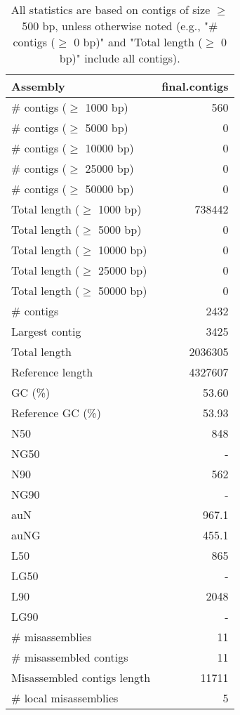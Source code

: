\documentclass[12pt,a4paper]{article}
\begin{document}
\begin{table}[ht]
\begin{center}
\caption{All statistics are based on contigs of size $\geq$ 500 bp, unless otherwise noted (e.g., "\# contigs ($\geq$ 0 bp)" and "Total length ($\geq$ 0 bp)" include all contigs).}
\begin{tabular}{|l*{1}{|r}|}
\hline
Assembly & final.contigs \\ \hline
\# contigs ($\geq$ 1000 bp) & 560 \\ \hline
\# contigs ($\geq$ 5000 bp) & 0 \\ \hline
\# contigs ($\geq$ 10000 bp) & 0 \\ \hline
\# contigs ($\geq$ 25000 bp) & 0 \\ \hline
\# contigs ($\geq$ 50000 bp) & 0 \\ \hline
Total length ($\geq$ 1000 bp) & 738442 \\ \hline
Total length ($\geq$ 5000 bp) & 0 \\ \hline
Total length ($\geq$ 10000 bp) & 0 \\ \hline
Total length ($\geq$ 25000 bp) & 0 \\ \hline
Total length ($\geq$ 50000 bp) & 0 \\ \hline
\# contigs & 2432 \\ \hline
Largest contig & 3425 \\ \hline
Total length & 2036305 \\ \hline
Reference length & 4327607 \\ \hline
GC (\%) & 53.60 \\ \hline
Reference GC (\%) & 53.93 \\ \hline
N50 & 848 \\ \hline
NG50 & - \\ \hline
N90 & 562 \\ \hline
NG90 & - \\ \hline
auN & 967.1 \\ \hline
auNG & 455.1 \\ \hline
L50 & 865 \\ \hline
LG50 & - \\ \hline
L90 & 2048 \\ \hline
LG90 & - \\ \hline
\# misassemblies & 11 \\ \hline
\# misassembled contigs & 11 \\ \hline
Misassembled contigs length & 11711 \\ \hline
\# local misassemblies & 5 \\ \hline

\end{tabular}
\end{center}
\end{table}
\end{document}
